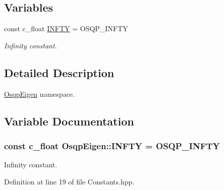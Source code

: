 \subsection*{Variables}
\begin{DoxyCompactItemize}
\item 
const c\+\_\+float \hyperlink{namespaceOsqpEigen_acfe9d2ea05e99677c0dc9e8f5646098d}{I\+N\+F\+TY} = O\+S\+Q\+P\+\_\+\+I\+N\+F\+TY
\begin{DoxyCompactList}\small\item\em Infinity constant. \end{DoxyCompactList}\end{DoxyCompactItemize}


\subsection{Detailed Description}
\hyperlink{namespaceOsqpEigen}{Osqp\+Eigen} namespace. 

\subsection{Variable Documentation}
\subsubsection[{\texorpdfstring{I\+N\+F\+TY}{INFTY}}]{\setlength{\rightskip}{0pt plus 5cm}const c\+\_\+float Osqp\+Eigen\+::\+I\+N\+F\+TY = O\+S\+Q\+P\+\_\+\+I\+N\+F\+TY}\label{namespaceOsqpEigen_acfe9d2ea05e99677c0dc9e8f5646098d}


Infinity constant. 



Definition at line 19 of file Constants.\+hpp.

